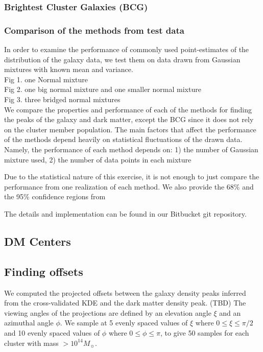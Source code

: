 \documentclass[letterpaper,useAMS,usenatbib]{mn2e}
\begin{document}
\subsubsection{Brightest Cluster Galaxies (BCG)}

\subsubsection{Comparison of the methods from test data}
In order to examine the performance of commonly used point-estimates of the
distribution of the galaxy data, we test them on data drawn from Gaussian mixtures with
known mean and variance. \\
Fig 1. one Normal mixture \\  
Fig 2. one big normal mixture and one smaller normal mixture \\ 
Fig 3. three bridged normal mixtures \\  
We compare the properties and performance of each of the
methods for finding the peaks of the galaxy and dark matter, 
except the BCG since it does not rely on the cluster member population. 
The main factors that affect the performance of the methods depend heavily on
statistical fluctuations of the drawn data. Namely, the performance of each
method depends on: 1) the
number of Gaussian mixture used, 2) the number of data points in each mixture

Due to the statistical nature of this exercise, it is not enough to just
compare the performance from one realization of each method. We also provide
the 68\% and the 95\% confidence regions from 


The details and implementation can be found in our Bitbucket git repository.



\subsection{DM Centers}
\subsection{Finding offsets} 

We computed the projected offsets between the galaxy density peaks inferred from the
cross-validated KDE and the dark matter density peak. (TBD) 
The viewing angles of the projections are defined by an elevation angle
$\xi$ and an azimuthal angle $\phi$. 
We sample at 5 evenly spaced values of $\xi$ where $0 \leq \xi \leq \pi / 2$ and 
10 evenly spaced values of $\phi$ where $0 \leq \phi \leq \pi$, to give 50
samples for each cluster with mass $> 10^{14} M_\sun$. 
\end{document}
